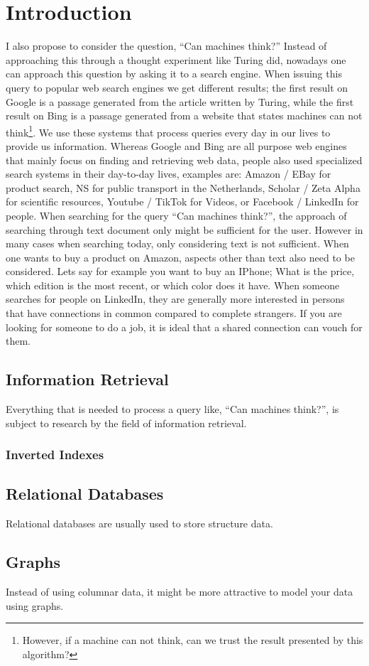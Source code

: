 \chapter{Introduction}


I also propose to consider the question, ``Can machines think?'' Instead of approaching this through a thought experiment like Turing did, nowadays one can approach this question by asking it to a search engine. When issuing this query to popular web search engines we get different results; the first result on Google is a passage generated from the article written by Turing, while the first result on Bing is a passage generated from a website that states machines can not think\footnote{However, if a machine can not think, can we trust the result presented by this algorithm?}.
We use these systems that process queries every day in our lives to provide us information. Whereas Google and Bing are all purpose web engines that mainly focus on finding and retrieving web data, people also used specialized search systems in their day-to-day lives, examples are: Amazon / EBay for product search, NS for public transport in the Netherlands, Scholar / Zeta Alpha for scientific resources, Youtube / TikTok for Videos, or Facebook / LinkedIn for people.
When searching for the query ``Can machines think?'', the approach of searching through text document only might be sufficient for the user. However in many cases when searching today, only considering text is not sufficient. When one wants to buy a product on Amazon, aspects other than text also need to be considered. Lets say for example you want to buy an IPhone; What is the price, which edition is the most recent, or which color does it have. When someone searches for people on LinkedIn, they are generally more interested in persons that have connections in common compared to complete strangers. If you are looking for someone to do a job, it is ideal that a shared connection can vouch for them. 

\section{Information Retrieval}
Everything that is needed to process a query like, ``Can machines think?'', is subject to research by the field of information retrieval. 

\subsection{Inverted Indexes}

\section{Relational Databases}
Relational databases are usually used to store structure data. 

\section{Graphs}
Instead of using columnar data, it might be more attractive to model your data using graphs. 